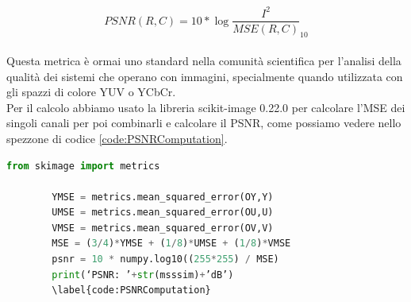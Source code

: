 \begin{equation}\label{eq:PSNR}
    PSNR(R,C)  =  10 * \log{\dfrac{I^2}{MSE(R,C)}}_{10}
\end{equation}\\
Questa metrica è ormai uno standard nella comunità scientifica per l’analisi della qualità dei sistemi che operano con immagini, specialmente quando utilizzata con gli spazzi di colore YUV o YCbCr.\\
Per il calcolo abbiamo usato la libreria scikit-image 0.22.0 per calcolare l’MSE dei singoli canali per poi combinarli e calcolare il PSNR, come possiamo vedere nello spezzone di codice \ref{code:PSNRComputation}.\\
\begin{adjustbox}{max width=\textwidth}
    \begin{lstlisting}[language=Python, caption=Spezzone di codice per il calcolo del PSNR pesato, label=code:PSNRComputation]
        from skimage import metrics
        
        YMSE = metrics.mean_squared_error(OY,Y)
        UMSE = metrics.mean_squared_error(OU,U)
        VMSE = metrics.mean_squared_error(OV,V)
        MSE = (3/4)*YMSE + (1/8)*UMSE + (1/8)*VMSE
        psnr = 10 * numpy.log10((255*255) / MSE)
        print(‘PSNR: ’+str(msssim)+’dB’)
        \label{code:PSNRComputation}
    \end{lstlisting}
\end{adjustbox}   
    


